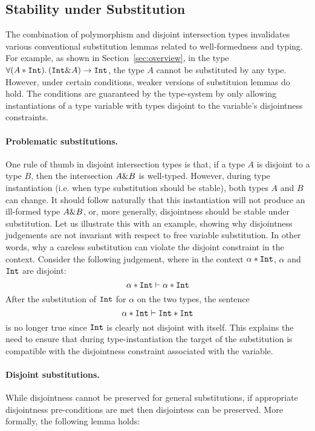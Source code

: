 \subsection{Stability under Substitution}
The combination of polymorphism and disjoint intersection types
invalidates various conventional substitution lemmas related to
well-formedness and typing.  
For example, as shown in Section~\ref{sec:overview}, in the type 
$\forall (A * \texttt{Int}).\, (\texttt{Int} \& A) \to \texttt{Int}$, the type $A$ cannot be substituted by any type.
However, under certain conditions, weaker versions of substituion lemmas do hold. 
The conditions are guaranteed by the type-system by only
allowing instantiations of a type variable with types disjoint to the
variable's disjointness constraints.

\paragraph{Problematic substitutions.}
One rule of thumb in disjoint intersection types is that, if a type
$A$ is disjoint to a type $B$, then the intersection $A \& B$ is
well-typed.  However, during type instantiation (i.e. when type
substitution should be stable), both types $A$ and $B$ can change.  It
should follow naturally that this instantiation will not produce an
ill-formed type $A \& B$, or, more generally, disjointness should
be stable under substitution.  Let us illustrate this with an example,
showing why disjointness judgements are not invariant with respect to
free variable substitution.  In other words, why a careless
substitution can violate the disjoint constraint in the context.
Consider the following judgement, where in the context $\alpha
* \texttt{Int}$, $\alpha$ and $\texttt{Int}$ are disjoint:
\[ \alpha * \texttt{Int} \vdash \alpha * \texttt{Int} \]
After the substitution of $\texttt{Int}$ for $\alpha$ on the two types, the sentence
\[ \alpha * \texttt{Int} \vdash \texttt{Int} * \texttt{Int} \]
is no longer true since $\texttt{Int}$ is clearly not disjoint with itself.
This explains the need to ensure that during type-instantiation the target of the substitution  
is compatible with the disjointness constraint associated with the variable. 

\paragraph{Disjoint substitutions.}
While disjointness cannot be preserved for general substitutions,
if appropriate disjointness pre-conditions are met then disjointess can
be preserved. More formally, the following lemma holds: 

